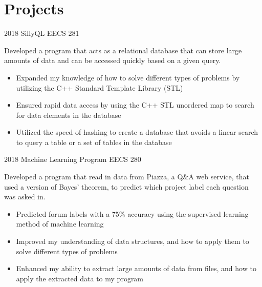 \documentclass[]{cv-style}
\begin{document}
\section{Projects}
\begin{entrylist}
\entry
{2018}
{SillyQL}
{EECS 281}
{Developed a program that acts as a relational database that can store large amounts of data and can be accessed quickly based on a given query.
\begin{itemize}
    \item Expanded my knowledge of how to solve different types of problems by utilizing the C++ Standard Template Library (STL)
    \item Ensured rapid data access by using the C++ STL unordered map to search for data elements in the database
    \item Utilized the speed of hashing to create a database that avoids a linear search to query a table or a set of tables in the database
\end{itemize}}
\entry
{2018}
{Machine Learning Program}
{EECS 280}
{Developed a program that read in data from Piazza, a Q\&A web service, that used a version of Bayes' theorem, to predict which project label each question was asked in.
\begin{itemize}
    \item Predicted forum labels with a 75\% accuracy using the supervised learning method of machine learning
    \item Improved my understanding of data structures, and how to apply them to solve different types of problems
    \item Enhanced my ability to extract large amounts of data from files, and how to apply the extracted data to my program
\end{itemize}}

\end{entrylist}
\end{document}

